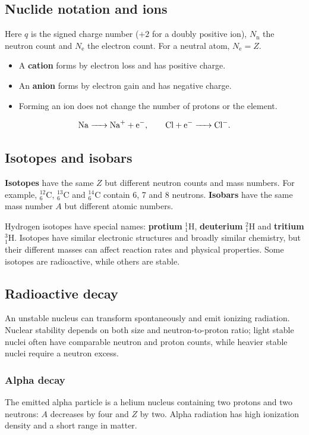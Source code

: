 \documentclass[a4paper,10pt]{article}
\begin{document}
\subsection{Nuclide notation and ions}
Here $q$ is the signed charge number ($+2$ for a doubly positive ion),
$N_{\mathrm n}$ the neutron count and $N_{\mathrm e}$ the electron count.
For a neutral atom, $N_{\mathrm e}=Z$.
\begin{itemize}
  \item A \textbf{cation} forms by electron loss and has positive charge.
  \item An \textbf{anion} forms by electron gain and has negative charge.
  \item Forming an ion does not change the number of protons or the element.
\end{itemize}
\[
 \ce{Na -> Na+ + e-},\qquad \ce{Cl + e- -> Cl-}.
\]

\subsection{Isotopes and isobars}
\textbf{Isotopes} have the same $Z$ but different neutron counts and mass numbers.
For example, $^{12}_{6}\mathrm C$, $^{13}_{6}\mathrm C$ and $^{14}_{6}\mathrm C$
contain 6, 7 and 8 neutrons. \textbf{Isobars} have the same mass number $A$
but different atomic numbers.

Hydrogen isotopes have special names: \textbf{protium} $^{1}_{1}\mathrm H$,
\textbf{deuterium} $^{2}_{1}\mathrm H$ and \textbf{tritium} $^{3}_{1}\mathrm H$.
Isotopes have similar electronic structures and broadly similar chemistry,
but their different masses can affect reaction rates and physical properties.
Some isotopes are radioactive, while others are stable.

\subsection{Radioactive decay}
An unstable nucleus can transform spontaneously and emit ionizing radiation.
Nuclear stability depends on both size and neutron-to-proton ratio; light stable
nuclei often have comparable neutron and proton counts, while heavier stable
nuclei require a neutron excess.

\subsubsection{Alpha decay}
The emitted alpha particle is a helium nucleus containing two protons and two neutrons:
$A$ decreases by four and $Z$ by two. Alpha radiation has high ionization density
and a short range in matter.
\end{document}
